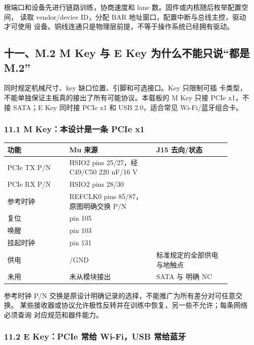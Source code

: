 %
根端口和设备先进行链路训练，协商速度和 lane 数。固件或内核随后枚举配置空间，
读取 vendor/device ID，分配 BAR 地址窗口，配置中断与总线主控，驱动才可使用
设备。铜线连通只是物理层前提，不等于操作系统已经拥有驱动。

\subsection{十一、M.2 M Key 与 E Key 为什么不能只说“都是 M.2”}


同时规定机械尺寸、key 缺口位置、引脚和可选接口。Key 只限制可插
卡类型，不能单独保证主板真的接出了所有可能协议。本载板的 M Key 只接 PCIe
x1，不接 SATA；E Key 同时接 PCIe x1 和 USB 2.0，适合常见 Wi-Fi/蓝牙组合卡。

\subsubsection{11.1 M Key：本设计是一条 PCIe x1}

\begin{longtable}{L{0.25\linewidth}L{0.35\linewidth}L{0.30\linewidth}}
\toprule
功能 & Mu 来源 & J15 去向/状态 \\
\midrule
PCIe TX P/N & HSIO2 pins 25/27，经 C49/C50 220 nF/16 V &  \\
PCIe RX P/N & HSIO2 pins 28/30 &  \\
参考时钟 & REFCLK0 pins 85/87，原图明确交换 P/N &  \\
复位 &  pin 105 &  \\
唤醒 &  pin 103 &  \\
挂起时钟 &  pin 131 &  \\
供电 & /GND & 标准规定的全部供电与地触点 \\
未用 & 未从模块接出 & SATA 与  明确 NC \\
\bottomrule
\end{longtable}

参考时钟 P/N 交换是原设计明确记录的选择，不能推广为所有差分对可任意交换。
某些接收器或协议允许极性反转并在训练中恢复，另一些不允许；每条网络必须查询
对应规范和器件能力。

\subsubsection{11.2 E Key：PCIe 常给 Wi-Fi，USB 常给蓝牙}

